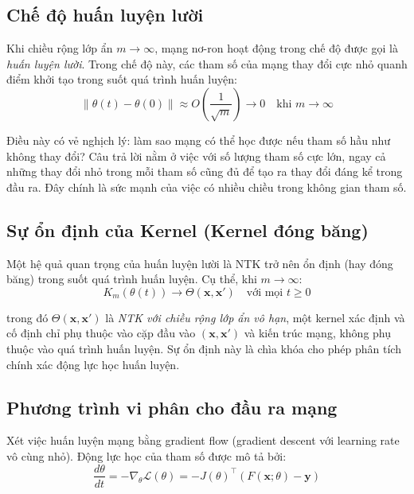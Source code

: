 \subsection{Chế độ huấn luyện lười}

Khi chiều rộng lớp ẩn $m \rightarrow \infty$, mạng nơ-ron hoạt động trong chế độ được gọi là \textit{huấn luyện lười}. Trong chế độ này, các tham số của mạng thay đổi cực nhỏ quanh điểm khởi tạo trong suốt quá trình huấn luyện:
\begin{equation}
    \|\theta(t) - \theta(0)\| \approx O\left(\frac{1}{\sqrt{m}}\right) \rightarrow 0 \quad \text{khi } m \rightarrow \infty
\end{equation}

Điều này có vẻ nghịch lý: làm sao mạng có thể học được nếu tham số hầu như không thay đổi? Câu trả lời nằm ở việc với số lượng tham số cực lớn, ngay cả những thay đổi nhỏ trong mỗi tham số cũng đủ để tạo ra thay đổi đáng kể trong đầu ra. Đây chính là sức mạnh của việc có nhiều chiều trong không gian tham số.

\subsection{Sự ổn định của Kernel (Kernel đóng băng)}

Một hệ quả quan trọng của huấn luyện lười là NTK trở nên ổn định (hay đóng băng) trong suốt quá trình huấn luyện. Cụ thể, khi $m \rightarrow \infty$:
\begin{equation}
    K_m(\theta(t)) \rightarrow \Theta(\mathbf{x}, \mathbf{x}') \quad \text{với mọi } t \geq 0
\end{equation}

trong đó $\Theta(\mathbf{x}, \mathbf{x}')$ là \textit{NTK với chiều rộng lớp ẩn vô hạn}, một kernel xác định và cố định chỉ phụ thuộc vào cặp đầu vào $(\mathbf{x}, \mathbf{x}')$ và kiến trúc mạng, không phụ thuộc vào quá trình huấn luyện. Sự ổn định này là chìa khóa cho phép phân tích chính xác động lực học huấn luyện.

\subsection{Phương trình vi phân cho đầu ra mạng}

Xét việc huấn luyện mạng bằng gradient flow (gradient descent với learning rate vô cùng nhỏ). Động lực học của tham số được mô tả bởi:
\begin{equation}
    \frac{d\theta}{dt} = -\nabla_\theta \mathcal{L}(\theta) = -J(\theta)^\top (F(\mathbf{x}; \theta) - \mathbf{y})
\end{equation}

